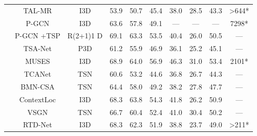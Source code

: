 \documentclass[10pt,twocolumn,letterpaper]{article}
\begin{document}
\begin{table*}[]
{\begin{tabular}{cccccccccc}
                              & TAL-MR \cite{zhao2020bottom}                                            & I3D \cite{carreira2017quo}      & 53.9          & 50.7          & 45.4          & 38.0          & 28.5          & 43.3 & \textgreater644* \\
                              & P-GCN \cite{zeng2019graph}                                              & I3D \cite{carreira2017quo}      & 63.6          & 57.8          & 49.1          & ---           & ---           & ---  & 7298* \\
                              & P-GCN \cite{zeng2019graph} +TSP \cite{alwassel2021tsp} & R(2+1)1 D \cite{tran2018closer}                  & 69.1          & 63.3          & 53.5          & 40.4          & 26.0          & 50.5 & --- \\
                              & TSA-Net \cite{gong2020scale}                                            & P3D \cite{qiu2017learning}      & 61.2          & 55.9          & 46.9          & 36.1          & 25.2          & 45.1 & --- \\
                              & MUSES \cite{liu2021multi}                                               & I3D \cite{carreira2017quo}      & 68.9          & 64.0          & 56.9          & 46.3          & 31.0          & 53.4 & 2101* \\
                              & TCANet \cite{qing2021temporal}                                          & TSN \cite{wang2016temporal}     & 60.6          & 53.2          & 44.6          & 36.8          & 26.7          & 44.3 & --- \\
                              & BMN-CSA \cite{sridhar2021class}                                         & TSN \cite{wang2016temporal}     & 64.4          & 58.0          & 49.2          & 38.2          & 27.8          & 47.7 & --- \\
                              & ContextLoc \cite{zhu2021enriching}                                      & I3D \cite{carreira2017quo}      & 68.3          & 63.8          & 54.3          & 41.8          & 26.2          & 50.9 & --- \\
                              & VSGN \cite{zhao2021video}                                               & TSN \cite{wang2016temporal}     & 66.7          & 60.4          & 52.4          & 41.0          & 30.4          & 50.2 & --- \\
                              & RTD-Net \cite{tan2021relaxed}                                           & I3D \cite{carreira2017quo}      & 68.3          & 62.3          & 51.9          & 38.8          & 23.7          & 49.0 & \textgreater211* \\ 

\end{tabular}}
\end{table*}
\end{document}
